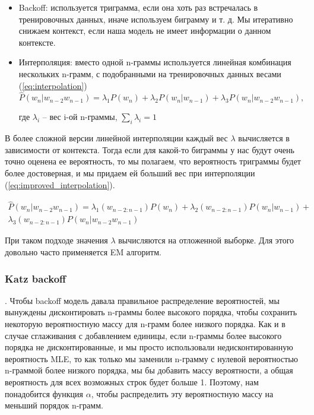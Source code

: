 \begin{itemize}
	\item Backoff: используется триграмма, если она хоть раз встречалась в тренировочных данных, иначе используем биграмму и т. д. Мы итеративно снижаем контекст, если наша модель не имеет информации о данном контексте.
	\item Интерполяция: вместо одной n-граммы используется линейная комбинация нескольких n-грамм, с подобранными на тренировочных данных весами (\ref{eq:interpolation})
	\begin{equation}
		\hat{P}(w_n|w_{n-2}w_{n-1}) = \lambda_1 P(w_n) + \lambda_2 P(w_n|w_{n-1}) + \lambda_3 P(w_n|w_{n-2}w_{n-1})
		\label{eq:interpolation},
	\end{equation}
	\begin{explanation}
		где $\lambda_i$ -- вес i-ой n-граммы, $\sum_{i}{\lambda_i} = 1$
	\end{explanation}
\end{itemize}

В более сложной версии линейной интерполяции каждый вес $\lambda$ вычисляется в зависимости от контекста. Тогда если для какой-то биграммы у нас будут очень точно оценена ее вероятность, то мы полагаем, что вероятность триграммы будет более достоверная, и мы придаем ей больший вес при интерполяции (\ref{eq:improved_interpolation}).

\begin{equation}
	\begin{split}
	\hat{P}(w_n|w_{n-2}w_{n-1}) = \lambda_1(w_{n-2:n-1}) P(w_n) + \lambda_2(w_{n-2:n-1}) P(w_n|w_{n-1}) + \\ \lambda_3(w_{n-2:n-1}) P(w_n|w_{n-2}w_{n-1})
	\end{split}
	\label{eq:improved_interpolation}
\end{equation}

При таком подходе значения $\lambda$ вычисляются на отложенной выборке. Для этого довольно часто применяется EM алгоритм.

\subsubsection{Katz backoff}. Чтобы backoff модель давала правильное распределение вероятностей, мы вынуждены дисконтировать n-граммы более высокого порядка, чтобы сохранить некоторую вероятностную массу для n-грамм более низкого порядка. Как и в случае сглаживания с добавлением единицы, если n-граммы более высокого порядка не дисконтированные, и мы просто использовали недисконтированную вероятность MLE, то как только мы
заменили n-грамму с нулевой вероятностью n-граммой более низкого порядка, мы бы добавить массу вероятности, а общая вероятность для всех возможных строк будет больше 1. Поэтому, нам понадобится функция $\alpha$, чтобы распределить эту вероятностную массу на меньший порядок n-грамм. ~\cite{n_grams}

